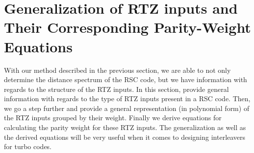 \section{Generalization of RTZ inputs and Their Corresponding Parity-Weight Equations}
With our method described in the previous section, we are able to not only determine the distance spectrum of the RSC code, but we have information with regards to the structure of the RTZ inputs. In this section, provide general information with regards to the type of RTZ inputs present in a RSC code. Then, we go a step further and provide a general representation (in polynomial form) of the RTZ inputs grouped by their weight. Finally we derive equations for calculating the parity weight for these RTZ inputs. The generalization as well as the derived equations will be very useful when it comes to designing interleavers for turbo codes.




